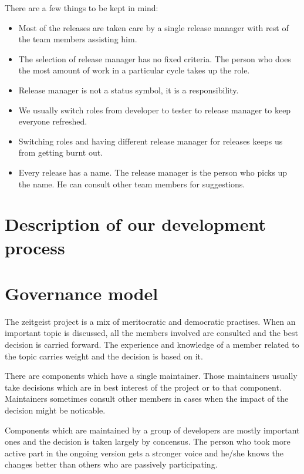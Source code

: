 There are a few things to be kept in mind:
\begin{itemize}
\item Most of the releases are taken care by a single release manager 
with rest of the team members assisting him. 
\item The selection of release manager has no fixed criteria. The 
person who does the most amount of work in a particular cycle takes 
up the role.
\item Release manager is not a status symbol, it is a responsibility.
\item We usually switch roles from developer to tester to 
release manager to keep everyone refreshed.
\item Switching roles and having different release manager for releases 
keeps us from getting burnt out.
\item Every release has a name. The release manager is the person who 
picks up the name. He can consult other team members for suggestions.
\end{itemize}

\section{Description of our development process}
\section{Governance model}

The zeitgeist project is a mix of meritocratic and democratic practises. 
When an important topic is discussed, all the members involved are 
consulted and the best decision is carried forward. The experience and 
knowledge of a member related to the topic carries weight and the decision 
is based on it.

There are components which have a single maintainer. Those maintainers usually 
take decisions which are in best interest of the project or to that component. 
Maintainers sometimes consult other members in cases when the impact of the 
decision might be noticable. 

Components which are maintained by a group of developers are mostly important 
ones and the decision is taken largely by concensus. The person who took more 
active part in the ongoing version gets a stronger voice and he/she knows the 
changes better than others who are passively participating. 